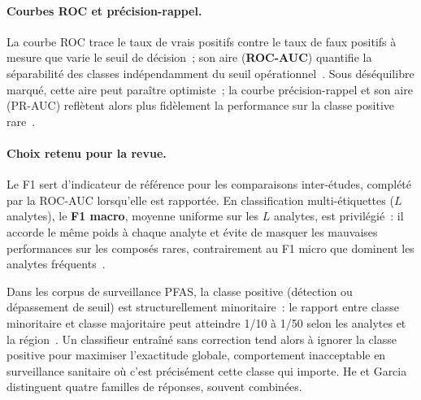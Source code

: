 \paragraph{Courbes ROC et pr\'ecision-rappel.}
La courbe ROC trace le taux de vrais positifs contre le taux de faux positifs \`a mesure que varie le seuil de d\'ecision~; son aire (\textbf{ROC-AUC}) quantifie la s\'eparabilit\'e des classes ind\'ependamment du seuil op\'erationnel~\cite{fawcett2006roc}.
Sous d\'es\'equilibre marqu\'e, cette aire peut para\^itre optimiste~; la courbe pr\'ecision-rappel et son aire (PR-AUC) refl\`etent alors plus fid\`element la performance sur la classe positive rare~\cite{davis2006prroc,saito2015prc}.

\paragraph{Choix retenu pour la revue.}
Le F1 sert d'indicateur de r\'ef\'erence pour les comparaisons inter-\'etudes, compl\'et\'e par la ROC-AUC lorsqu'elle est rapport\'ee.
En classification multi-\'etiquettes ($L$ analytes), le \textbf{F1 macro}, moyenne uniforme sur les $L$ analytes, est privil\'egi\'e~: il accorde le m\^eme poids \`a chaque analyte et \'evite de masquer les mauvaises performances sur les compos\'es rares, contrairement au F1 micro que dominent les analytes fr\'equents~\cite{sokolova2009metrics}.


\label{sec:chap2-desequilibre}

Dans les corpus de surveillance PFAS, la classe positive (d\'etection ou d\'epassement de seuil) est structurellement minoritaire~: le rapport entre classe minoritaire et classe majoritaire peut atteindre 1/10 \`a 1/50 selon les analytes et la r\'egion~\cite{dong2024pfas,george2021pfas}.
Un classifieur entra\^in\'e sans correction tend alors \`a ignorer la classe positive pour maximiser l'exactitude globale, comportement inacceptable en surveillance sanitaire o\`u c'est pr\'ecis\'ement cette classe qui importe.
He et Garcia~\cite{he2009imbalanced} distinguent quatre familles de r\'eponses, souvent combin\'ees.


